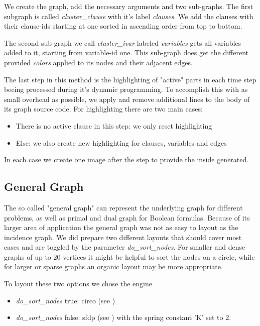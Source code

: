\documentclass[a4paper, 12pt, bibliography=totoc]{scrartcl}
\begin{document}
We create the graph, add the necessary arguments and two sub-graphs. 
The first subgraph is called \textit{cluster\_clause} with it's label \textit{clauses}.
We add the clauses with their clause-ids starting at one sorted in ascending order from top to bottom.

The second sub-graph we call \textit{cluster\_ivar} labeled \textit{variables} gets all variables added to it, 
starting from variable-id one. 
This sub-graph does get the different provided \textit{colors} applied to its nodes and their adjacent edges.

The last step in this method is the highlighting of "active" parts in each time step beeing processed during it's dynamic programming. To accomplish this with as small overhead as possible, we apply and remove additional lines to the body of its graph source code. 
For highlighting there are two main cases:
\begin{itemize}
	\item There is no active clause in this step: we only reset highlighting
	\item Else: we also create new highlighting for clauses, variables and edges
\end{itemize}
In each case we create one image after the step to provide the inside generated.

\subsection{General Graph}
The so called "general graph" can represent the underlying graph for different problems, as well as primal and dual graph for Boolean formulas.
Because of its larger area of application the general graph was not as easy to layout as the incidence graph.
We did prepare two different layouts that should cover most cases and are toggled by the parameter \textit{do\_sort\_nodes}.
For smaller and dense graphs of up to 20 vertices it might be helpful to sort the nodes on a circle, while for larger or sparse graphs an organic layout may be more appropriate.

To layout these two options we chose the engine 
\begin{itemize}
	\item \textit{do\_sort\_nodes} true: circo (see \cite{ST99})
	\item \textit{do\_sort\_nodes} false: sfdp (see \cite{Hu05}) with the spring constant 'K' set to 2.
\end{itemize}
\end{document}
